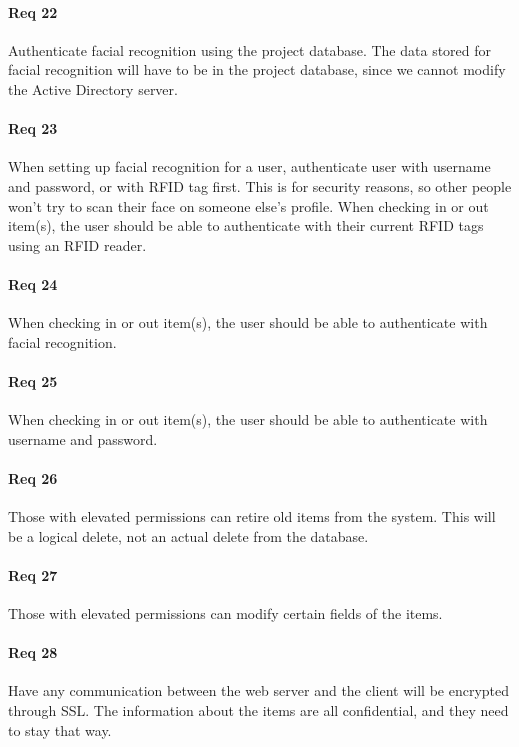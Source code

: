 \documentclass[10pt, onecolumn, twoside, peerreview]{IEEEtran}
\begin{document}
\paragraph*{Req 22} Authenticate facial recognition using the project database. The data stored for facial recognition will have to be in
the project database, since we cannot modify the Active Directory server.\\

\paragraph*{Req 23} When setting up facial recognition for a user, authenticate user with username and password, or with RFID tag first.
This is for security reasons, so other people won’t try to scan their face on someone else’s profile. When checking in
or out item(s), the user should be able to authenticate with their current RFID tags using an RFID reader.\\

\paragraph*{Req 24} When checking in or out item(s), the user should be able to authenticate with facial recognition.\\

\paragraph*{Req 25} When checking in or out item(s), the user should be able to authenticate with username and password.\\

\paragraph*{Req 26} Those with elevated permissions can retire old items from the system. This will be a logical delete, not an actual
delete from the database.\\

\paragraph*{Req 27} Those with elevated permissions can modify certain fields of the items.\\

\paragraph*{Req 28} Have any communication between the web server and the client will be encrypted through SSL. The information about the
items are all confidential, and they need to stay that way.\\
\end{document}
